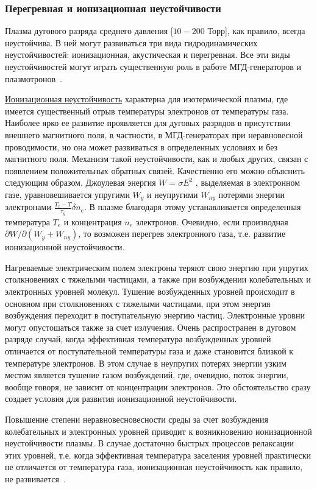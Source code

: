 \documentclass[10pt, a4paper]{article}
\begin{document}
\subsubsection{Перегревная и ионизационная неустойчивости}

Плазма дугового разряда среднего давления [$10-200$ Торр], как правило, всегда неустойчива. В ней могут развиваться три вида гидродинамических неустойчивостей: ионизационная, акустическая и перегревная. Все эти виды неустойчивостей могут играть существенную роль в работе МГД-генераторов и плазмотронов~\cite{golubev}.

\uline{Ионизационная неустойчивость} характерна для изотермической плазмы, где имеется существенный отрыв температуры электронов от температуры газа. Наиболее ярко ее развитие проявляется для дуговых разрядов в присутствии внешнего магнитного поля, в частности, в МГД-генераторах при неравновесной проводимости, но она может развиваться в определенных условиях и без магнитного поля. Механизм такой неустойчивости, как и любых других, связан с появлением положительных обратных связей. Качественно его можно объяснить следующим образом. Джоулевая энергия $W=\sigma E^2$ , выделяемая в электронном газе, уравновешивается упругими $W_y$ и неупругими $W_{ny}$ потерями энергии электронами $\frac{T_e-T}{\tau_y}\delta n_e$. В плазме благодаря этому устанавливается определенная температура $T_e$ и концентрация $n_e$ электронов. Очевидно, если производная $\partial W/\partial (W_y+W_{ny})$, то возможен перегрев электронного газа, т.е. развитие ионизационной неустойчивости.
 
Нагреваемые электрическим полем электроны теряют свою энергию при упругих столкновениях с тяжелыми частицами, а также при возбуждении колебательных и электронных уровней молекул. Тушение возбужденных уровней происходит в основном при столкновениях с тяжелыми частицами, при этом энергия возбуждения переходит в поступательную энергию частиц. Электронные уровни могут опустошаться также за счет излучения. Очень распространен в дуговом разряде случай, когда эффективная температура возбужденных уровней отличается от поступательной температуры газа и даже становится близкой к температуре электронов. В этом случае в неупругих потерях энергии узким местом является тушение газом возбуждений, где, очевидно, поток энергии, вообще говоря, не зависит от концентрации электронов. Это обстоятельство сразу создает условия для развития ионизационной неустойчивости.
 
Повышение степени неравновесновесности среды за счет возбуждения колебательных и электронных уровней приводит к возникновению ионизационной неустойчивости плазмы. В случае достаточно быстрых процессов релаксации этих уровней, т.е. когда эффективная температура заселения уровней практически не отличается от температура газа, ионизационная неустойчивость как правило, не развивается~\cite{golubev}.
\end{document}
